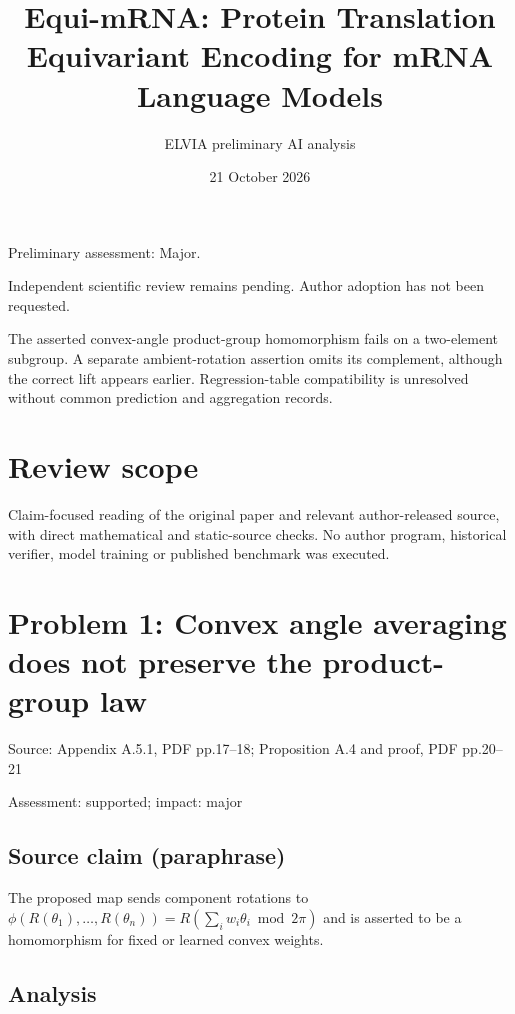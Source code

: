 \documentclass[11pt]{article}
\begin{document}
\title{Equi-mRNA: Protein Translation Equivariant Encoding for mRNA Language Models}

\author{ELVIA preliminary AI analysis}\date{21 October 2026}\maketitle

Preliminary assessment: Major.\par

Independent scientific review remains pending. Author adoption has not been requested.

The asserted convex-angle product-group homomorphism fails on a two-element subgroup. A separate ambient-rotation assertion omits its complement, although the correct lift appears earlier. Regression-table compatibility is unresolved without common prediction and aggregation records.

\section*{Review scope}

Claim-focused reading of the original paper and relevant author-released source, with direct mathematical and static-source checks. No author program, historical verifier, model training or published benchmark was executed.

\section*{Problem 1: Convex angle averaging does not preserve the product-group law}

Source: Appendix A.5.1, PDF pp.17–18; Proposition A.4 and proof, PDF pp.20–21

Assessment: supported; impact: major

\subsection*{Source claim (paraphrase)}

The proposed map sends component rotations to \(\phi(R(\theta_1),\ldots,R(\theta_n))=R(\sum_iw_i\theta_i\bmod2\pi)\) and is asserted to be a homomorphism for fixed or learned convex weights.

\subsection*{Analysis}
\end{document}
